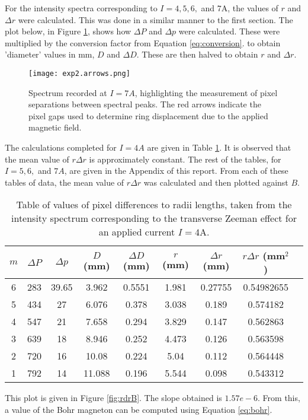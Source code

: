\documentclass[11pt,twocolumn, a4paper]{article}
\numberwithin{equation}{section} %
\numberwithin{figure}{section} %
\numberwithin{table}{section} %
\begin{document}
For the intensity spectra corresponding to \(I = 4,5,6,\) and $7$A, the values of \(r\) and \(\Delta r\) were calculated. This was done in a similar manner to the first section. The plot below, in Figure \ref{fig:exp2arrow}, shows how \(\Delta P \) and \(\Delta p\) were calculated. These were multiplied by the conversion factor from Equation \ref{eq:conversion}. to obtain 'diameter' values in mm, \(D\) and \(\Delta D\). These are then halved to obtain \(r\) and \(\Delta r\).

\begin{figure}[H]
    \centering
    \texttt{[image: exp2.arrows.png]}
    \caption{Spectrum recorded at $I=7A$, highlighting the measurement of pixel separations between spectral peaks. The red arrows indicate the pixel gaps used to determine ring displacement due to the applied magnetic field. }
    \label{fig:exp2arrow}
\end{figure}
The calculations completed for \(I=4A\) are given in Table \ref{tab:values_4A}. It is observed that the mean value of \(r \Delta r\) is approximately constant. The rest of the tables, for \(I=5,6,\) and $7A$, are given in the Appendix of this report.  From each of these tables of data, the mean value of \(r\Delta r\) was calculated and then plotted against \(B\). 
\begin{table}[H]
    \centering
    \caption{Table of values of pixel differences to radii lengths, taken from the intensity spectrum corresponding to the transverse Zeeman effect for an applied current \(I=4\)A.}
    \begin{tabular}{|c|c|c|c|c|c|c|c|c|}
        \hline
        \( m \) & \( \Delta P \) & \( \Delta p \) & \( D\) (mm) & \( \Delta D \) (mm) & \( r \) (mm) & \( \Delta r \) (mm) & \( r \Delta r \) (mm$^2$) \\
        \hline
        6 & 283 & 39.65 & 3.962 & 0.5551 & 1.981 & 0.27755 & 0.54982655 \\
        5 & 434 & 27 & 6.076 & 0.378 & 3.038 & 0.189 & 0.574182 \\
        4 & 547 & 21 & 7.658 & 0.294 & 3.829 & 0.147 & 0.562863 \\
        3 & 639 & 18 & 8.946 & 0.252 & 4.473 & 0.126 & 0.563598 \\
        2 & 720 & 16 & 10.08 & 0.224 & 5.04 & 0.112 & 0.564448 \\
        1 & 792 & 14 & 11.088 & 0.196 & 5.544 & 0.098 & 0.543312 \\
        \hline
    \end{tabular}
    \label{tab:values_4A}
\end{table}
This plot is given in Figure \ref{fig:rdrB}. The slope obtained is \(1.57e-6 \). From this, a value of the Bohr magneton can be computed using Equation \ref{eq:bohr}.
\end{document}
